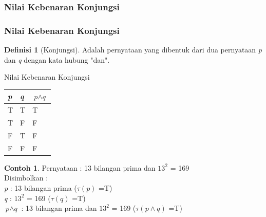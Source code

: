 \documentclass[handout]{beamer}
\theoremstyle{definition}
\newtheorem{definisi}[theorem]{Definisi}
\theoremstyle{example}
\newtheorem{contoh}[theorem]{Contoh}
\begin{document}
\subsubsection{Nilai Kebenaran Konjungsi}
\begin{frame}[shrink]
\frametitle{Nilai Kebenaran Konjungsi}
   \begin{definisi}[Konjungsi]
   	Adalah pernyataan yang dibentuk dari dua pernyataan \textit{p} dan \textit{q} dengan kata hubung "dan".   	
   \end{definisi}
    \begin{block}{Nilai Kebenaran Konjungsi}
    	\begin{tabular}{ | l | l | l | }
    		\hline
    		\textit{p} & \textit{q} & $\textit{p}\wedge\textit{q}$ \\ \hline
    		T & T & T \\ \hline
    		T & F & F \\ \hline
    		F & T & F \\ \hline
    		F & F & F \\     		 
    		\hline
    	\end{tabular}
    \end{block}
    \begin{contoh}
        Pernyataan : 13 bilangan prima dan $13^2$ = 169 \\
        Disimbolkan :\\
        \textit{p} : 13 bilangan prima ($\tau(\textit{p})$ =T)\\
        \textit{q} : $13^2$ = 169 ($\tau(\textit{q})$ =T)\\
        $\textit{p}\wedge\textit{q}$ : 13 bilangan prima dan $13^2$ = 169 ($\tau(\textit{p}\wedge\textit{q})$ =T)
    \end{contoh}
    
\end{frame}
\end{document}
